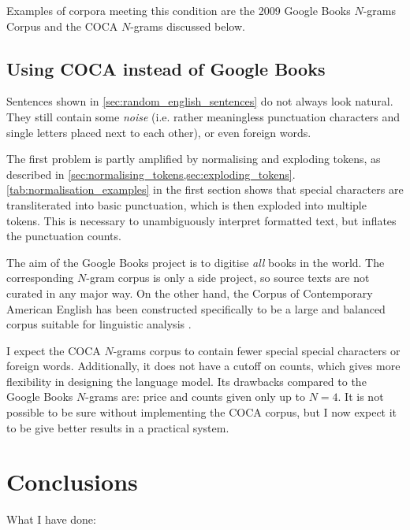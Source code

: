 \documentclass[draft]{IIBproject}
\makeatletter
\DeclareRobustCommand*{\ie}{i.e.\@\xspace}
\makeatother
\begin{document}
Examples of corpora meeting this condition are the 2009 Google Books $N$-grams Corpus and the COCA $N$-grams discussed below.

\subsection{Using COCA instead of Google Books}

Sentences shown in \cref{sec:random_english_sentences} do not always look natural. They still contain some \emph{noise} (\ie rather meaningless punctuation characters and single letters placed next to each other), or even foreign words.

The first problem is partly amplified by normalising and exploding tokens, as described in \cref{sec:normalising_tokens,sec:exploding_tokens}. \cref{tab:normalisation_examples} in the first section shows that special characters are transliterated into basic punctuation, which is then exploded into multiple tokens. This is necessary to unambiguously interpret formatted text, but inflates the punctuation counts.

The aim of the Google Books project is to digitise \emph{all} books in the world. The corresponding $N$-gram corpus is only a side project, so source texts are not curated in any major way. On the other hand, the Corpus of Contemporary American English has been constructed specifically to be a large and balanced corpus suitable for linguistic analysis \cite{coca2010}.

I expect the COCA $N$-grams corpus to contain fewer special special characters or foreign words. Additionally, it does not have a cutoff on counts, which gives more flexibility in designing the language model. Its drawbacks compared to the Google Books $N$-grams are: price and counts given only up to $N=4$. It is not possible to be sure without implementing the COCA corpus, but I now expect it to be give better results in a practical system.

\clearpage
\section{Conclusions}

What I have done:
\end{document}
